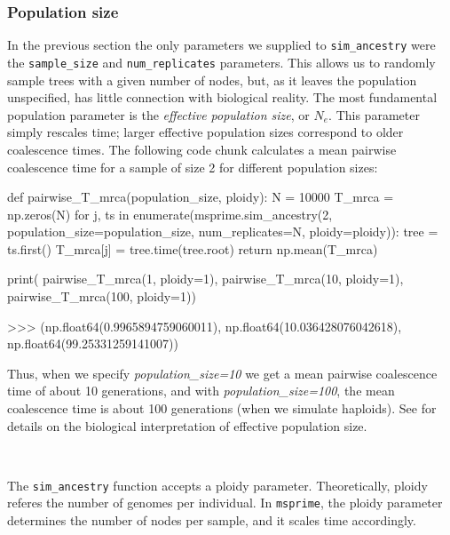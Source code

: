 \documentclass[graybox]{svmult}
\newcommand{\msprime}[0]{\texttt{msprime}}
\begin{document}
\subsubsection{Population size}\label{population-models}

In the previous section the only parameters we supplied to
\texttt{sim\_ancestry} were the \texttt{sample\_size} and
\texttt{num\_replicates} parameters. This allows us to randomly sample
trees with a given number of nodes, but, as it leaves the population
unspecified, has little connection with
biological reality. The most fundamental population parameter is the \emph{effective population size}, or
\(N_e\). This parameter simply rescales time; larger effective
population sizes correspond to older coalescence times. The following code chunk
calculates a mean pairwise coalescence time for a sample of size 2 for different
population sizes:

\begin{pythoncode}
def pairwise_T_mrca(population_size, ploidy):
    N = 10000
    T_mrca = np.zeros(N)
    for j, ts in enumerate(msprime.sim_ancestry(2,
            population_size=population_size,
            num_replicates=N, ploidy=ploidy)):
        tree = ts.first()
        T_mrca[j] = tree.time(tree.root)
    return np.mean(T_mrca)

print(
    pairwise_T_mrca(1, ploidy=1), pairwise_T_mrca(10, ploidy=1),
    pairwise_T_mrca(100, ploidy=1))

>>> (np.float64(0.9965894759060011),
     np.float64(10.036428076042618),
     np.float64(99.25331259141007))

\end{pythoncode}

    Thus, when we specify \emph{population\_size=10} we get a mean pairwise coalescence time of about
10 generations, and with \emph{population\_size=100}, the mean coalescence time is about
100 generations (when we simulate haploids). See \cite{wakely2008coalescent} for details on the
biological interpretation of effective population size.

\label{ploidy} \

The \texttt{sim\_ancestry} function accepts a ploidy parameter. Theoretically, ploidy referes the number of genomes per individual.
In \msprime, the ploidy parameter determines the number of nodes per sample, and it scales time accordingly.
\end{document}
